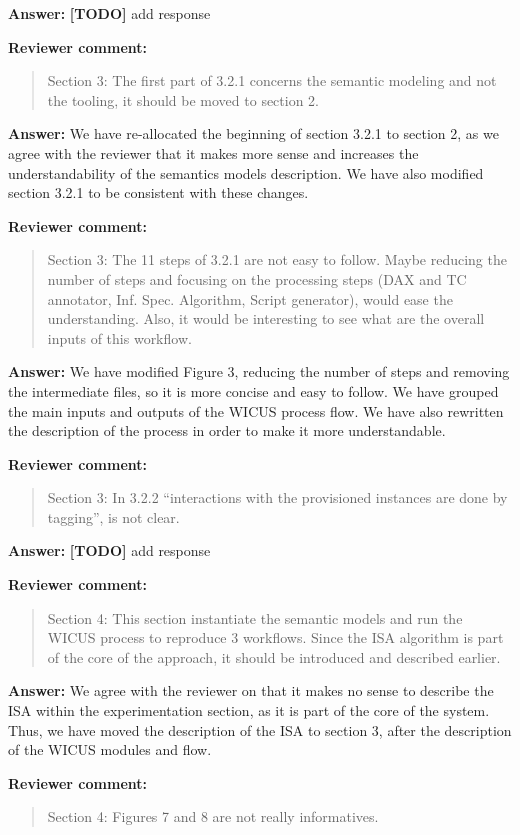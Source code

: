 \documentclass{letter}
\newenvironment{review}%
{\textbf{Reviewer comment:}\begin{quote}}%
{\end{quote}}%
\newcommand{\todo}[1]{%
      \color{red}\textbf{[TODO]} #1\color{black}}
\newcommand{\answer}[1]{%
      \textbf{Answer:} #1}
\begin{document}
\begin{letter}{}
\answer{\todo{add response}}


\begin{review}
Section 3: The first part of 3.2.1 concerns the semantic modeling and not the tooling, it should be moved to section 2.
\end{review}

\answer{We have re-allocated the beginning of section 3.2.1 to section 2, as we agree with the reviewer that it makes  more sense and increases the understandability of the semantics models description. We have also modified section 3.2.1 to be consistent with these changes.}


\begin{review}
Section 3: The 11 steps of 3.2.1 are not easy to follow. Maybe reducing the number of steps and focusing on the processing steps (DAX and TC annotator, Inf. Spec. Algorithm, Script generator), would ease the understanding. Also, it would be interesting to see what are the overall inputs of this workflow.
\end{review}

\answer{We have modified Figure 3, reducing the number of steps and removing the intermediate files, so it is more concise and easy to follow. We have grouped the main inputs and outputs of the WICUS process flow. We have also rewritten the description of the process in order to make it more understandable.}


\begin{review}
Section 3: In 3.2.2 ``interactions with the provisioned instances are done by tagging'', is not clear.
\end{review}

\answer{\todo{add response}}


\begin{review}
Section 4: This section instantiate the semantic models and run the WICUS process to reproduce 3 workflows. Since the ISA algorithm is part of the core of the approach, it should be introduced and described earlier.
\end{review}

\answer{We agree with the reviewer on that it makes no sense to describe the ISA within the experimentation section, as it is part of the core of the system. Thus, we have moved the description of the ISA to section 3, after the description of the WICUS modules and flow.}


\begin{review}
Section 4: Figures 7 and 8 are not really informatives.
\end{review}


\end{letter}
\end{document}
